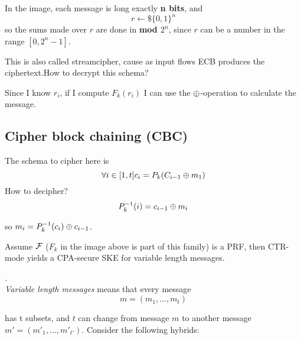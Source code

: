 In the image, each message is long exactly \textbf{n bits}, and 
\begin{equation*}
    r \leftarrow\$ \{0,1\}^{n}
\end{equation*}
so the sums made over $r$ are done in \textbf{mod $2^{n}$}, since $r$ can be a
number in the range $[0, 2^{n} -1]$.

This is also called streamcipher, cause as input flows ECB produces the ciphertext.How to decrypt this schema?

Since I know $r_{i}$, if I compute $F_{k}(r_{i})$ I can use the $\oplus$-operation to calculate the message.

\subsection{Cipher block chaining (CBC)}


The schema to cipher here is 
\[ 
    \forall i \in [1,t] c_{i}=P_{k}(C_{i-1}\oplus m_{1})
\]
How to decipher?
\begin{equation*}
    P_{k}^{-1}(i)= c_{i-1} \oplus m_{i}
\end{equation*}

so $m_{i}= P_{k}^{-1}(c_{i}) \oplus c_{i-1}$.

\begin{theorem}
    Assume $\mathcal{F}$ ($F_{k}$ in the image above is part of this family) is a PRF,
    then CTR-mode yields a CPA-secure SKE for variable length messages.
\end{theorem}.\\
\textit{Variable length messages}  means that  every message 
\[
    m=(m_{1}, ..., m_{t})
\]

has t subsets, and $t$ can change from message $m$ to another message
$m'=(m'_{1}, ..., m'_{t'})$.
Consider the following hybrids:


